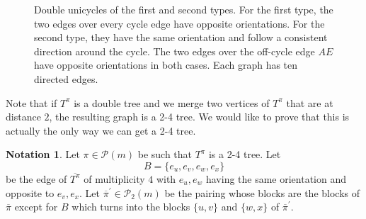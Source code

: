 \documentclass{article}
\theoremstyle{definition}
\newtheorem{notation}   [theorem]{Notation}
\newcommand{\cP}{\mathcal{P}}
\begin{document}
{\begin{figure}[htbp]
\begin{minipage}{0.48\linewidth}
\end{minipage}\hfill
\begin{minipage}{0.48\linewidth}
\centering
{}
\end{minipage}

\caption{Double unicycles of the first and second types.
For the first type, the two edges over every cycle edge
have opposite orientations.
For the second type, they have the same orientation
and follow a consistent direction around the cycle.
The two edges over the off-cycle edge $AE$ have opposite
orientations in both cases.
Each graph has ten directed edges.}
\label{fig:double-unicycle-types}
\end{figure}

Note that if $T^\pi$ is a double tree and we merge two vertices of $T^\pi$ that are at distance $2$, the resulting graph is a 2-4 tree. We would like to prove that this is actually the only way we can get a 2-4 tree.

\begin{notation}\label{Notation: New pi of 2-4 tree}
Let $\pi\in \cP(m)$ be such that $T^\pi$ is a 2-4 tree. Let 
$$B=\{e_u,e_v,e_w,e_x\}$$ 
be the edge of $\overline{T^\pi}$ of multiplicity $4$ with $e_u,e_w$ having the same orientation and opposite to $e_v,e_x$. Let $\overline{\pi}^\prime\in \cP_2(m)$ be the pairing whose blocks are the blocks of $\overline{\pi}$ except for $B$ which turns into the blocks $\{u,v\}$ and $\{w,x\}$ of $\overline{\pi}^\prime$.
\end{notation}

}
\end{document}
